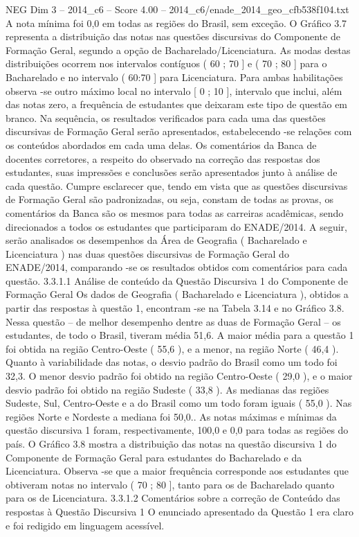 \begin{textsample}{NEG Dim 3 – 2014\_c6 – Score 4.00 – 2014\_c6/enade\_2014\_geo\_cfb538f104.txt}
A nota mínima foi 0,0 em todas as regiões do Brasil, sem exceção.
O Gráfico 3.7 representa a distribuição das notas nas questões discursivas do Componente de Formação Geral, segundo a opção de Bacharelado/Licenciatura.
As modas destas distribuições ocorrem nos intervalos contíguos ( 60 ; 70 ] e ( 70 ; 80 ] para o Bacharelado e no intervalo ( 60:70 ] para Licenciatura.
Para ambas habilitações observa -se outro máximo local no intervalo [ 0 ; 10 ], intervalo que inclui, além das notas zero, a frequência de estudantes que deixaram este tipo de questão em branco.
Na sequência, os resultados verificados para cada uma das questões discursivas de Formação Geral serão apresentados, estabelecendo -se relações com os conteúdos abordados em cada uma delas.
Os comentários da Banca de docentes corretores, a respeito do observado na correção das respostas dos estudantes, suas impressões e conclusões serão apresentados junto à análise de cada questão.
Cumpre esclarecer que, tendo em vista que as questões discursivas de Formação Geral são padronizadas, ou seja, constam de todas as provas, os comentários da Banca são os mesmos para todas as carreiras acadêmicas, sendo direcionados a todos os estudantes que participaram do ENADE/2014.
A seguir, serão analisados os desempenhos da Área de Geografia ( Bacharelado e Licenciatura ) nas duas questões discursivas de Formação Geral do ENADE/2014, comparando -se os resultados obtidos com comentários para cada questão. 3.3.1.1 Análise de conteúdo da Questão Discursiva 1 do Componente de Formação Geral Os dados de Geografia ( Bacharelado e Licenciatura ), obtidos a partir das respostas à questão 1, encontram -se na Tabela 3.14 e no Gráfico 3.8.
Nessa questão – de melhor desempenho dentre as duas de Formação Geral – os estudantes, de todo o Brasil, tiveram média 51,6.
A maior média para a questão 1 foi obtida na região Centro-Oeste ( 55,6 ), e a menor, na região Norte ( 46,4 ).
Quanto à variabilidade das notas, o desvio padrão do Brasil como um todo foi 32,3.
O menor desvio padrão foi obtido na região Centro-Oeste ( 29,0 ), e o maior desvio padrão foi obtido na região Sudeste ( 33,8 ).
As medianas das regiões Sudeste, Sul, Centro-Oeste e a do Brasil como um todo foram iguais ( 55,0 ).
Nas regiões Norte e Nordeste a mediana foi 50,0..
As notas máximas e mínimas da questão discursiva 1 foram, respectivamente, 100,0 e 0,0 para todas as regiões do país.
O Gráfico 3.8 mostra a distribuição das notas na questão discursiva 1 do Componente de Formação Geral para estudantes do Bacharelado e da Licenciatura.
Observa -se que a maior frequência corresponde aos estudantes que obtiveram notas no intervalo ( 70 ; 80 ], tanto para os de Bacharelado quanto para os de Licenciatura. 3.3.1.2 Comentários sobre a correção de Conteúdo das respostas à Questão Discursiva 1 O enunciado apresentado da Questão 1 era claro e foi redigido em linguagem acessível.

\end{textsample}

